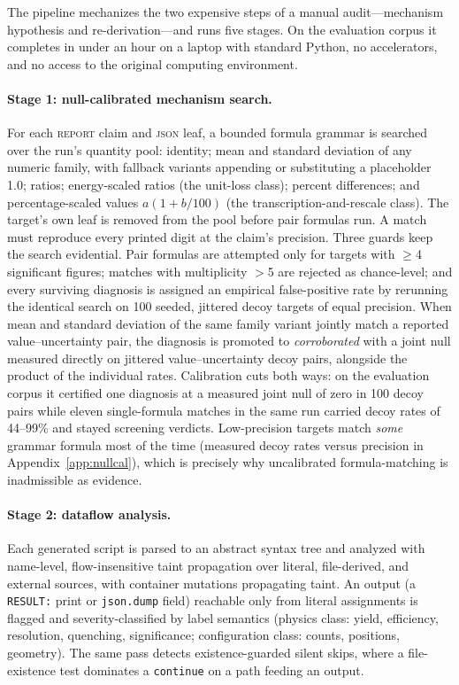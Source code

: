 \documentclass{article}
\begin{document}
The pipeline mechanizes the two expensive steps of a manual audit---mechanism hypothesis and re-derivation---and runs five stages. On the evaluation corpus it completes in under an hour on a laptop with standard Python, no accelerators, and no access to the original computing environment.

\paragraph{Stage 1: null-calibrated mechanism search.} For each \textsc{report} claim and \textsc{json} leaf, a bounded formula grammar is searched over the run's quantity pool: identity; mean and standard deviation of any numeric family, with fallback variants appending or substituting a placeholder 1.0; ratios; energy-scaled ratios (the unit-loss class); percent differences; and percentage-scaled values $a(1+b/100)$ (the transcription-and-rescale class). The target's own leaf is removed from the pool before pair formulas run. A match must reproduce every printed digit at the claim's precision. Three guards keep the search evidential. Pair formulas are attempted only for targets with $\geq$4 significant figures; matches with multiplicity $>$5 are rejected as chance-level; and every surviving diagnosis is assigned an empirical false-positive rate by rerunning the identical search on 100 seeded, jittered decoy targets of equal precision. When mean and standard deviation of the same family variant jointly match a reported value--uncertainty pair, the diagnosis is promoted to \emph{corroborated} with a joint null measured directly on jittered value--uncertainty decoy pairs, alongside the product of the individual rates. Calibration cuts both ways: on the evaluation corpus it certified one diagnosis at a measured joint null of zero in 100 decoy pairs while eleven single-formula matches in the same run carried decoy rates of 44--99\% and stayed screening verdicts. Low-precision targets match \emph{some} grammar formula most of the time (measured decoy rates versus precision in Appendix~\ref{app:nullcal}), which is precisely why uncalibrated formula-matching is inadmissible as evidence.

\paragraph{Stage 2: dataflow analysis.} Each generated script is parsed to an abstract syntax tree and analyzed with name-level, flow-insensitive taint propagation over literal, file-derived, and external sources, with container mutations propagating taint. An output (a \texttt{RESULT:} print or \texttt{json.dump} field) reachable only from literal assignments is flagged and severity-classified by label semantics (physics class: yield, efficiency, resolution, quenching, significance; configuration class: counts, positions, geometry). The same pass detects existence-guarded silent skips, where a file-existence test dominates a \texttt{continue} on a path feeding an output.
\end{document}
